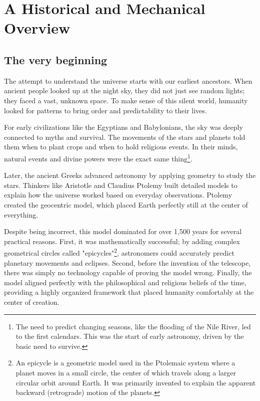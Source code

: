 \documentclass[10pt,a4paper]{article}
\begin{document}
\section{A Historical and Mechanical Overview}

\subsection{The very beginning}
The attempt to understand the universe starts with our earliest ancestors. When ancient people looked up at the night sky, they did not just see random lights; they faced a vast, unknown space. To make sense of this silent world, humanity looked for patterns to bring order and predictability to their lives.

For early civilizations like the Egyptians and Babylonians, the sky was deeply connected to myths and survival. The movements of the stars and planets told them when to plant crops and when to hold religious events. In their minds, natural events and divine powers were the exact same thing\footnote{The need to predict changing seasons, like the flooding of the Nile River, led to the first calendars. This was the start of early astronomy, driven by the basic need to survive.}. 

Later, the ancient Greeks advanced astronomy by applying geometry to study the stars. Thinkers like Aristotle and Claudius Ptolemy built detailed models to explain how the universe worked based on everyday observations. Ptolemy created the geocentric model, which placed Earth perfectly still at the center of everything. 

Despite being incorrect, this model dominated for over 1,500 years for several practical reasons. First, it was mathematically successful; by adding complex geometrical circles called "epicycles"\footnote{An epicycle is a geometric model used in the Ptolemaic system where a planet moves in a small circle, the center of which travels along a larger circular orbit around Earth. It was primarily invented to explain the apparent backward (retrograde) motion of the planets.}, astronomers could accurately predict planetary movements and eclipses. Second, before the invention of the telescope, there was simply no technology capable of proving the model wrong. Finally, the model aligned perfectly with the philosophical and religious beliefs of the time, providing a highly organized framework that placed humanity comfortably at the center of creation.
\end{document}
